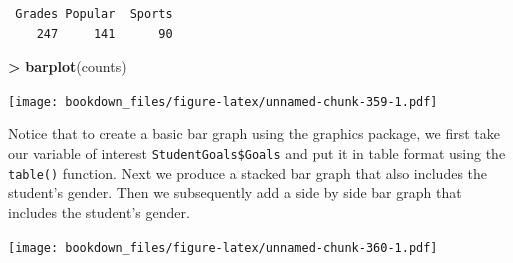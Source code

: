 \documentclass[
]{krantz}
\makeatletter
\newenvironment{Shaded}{\begin{snugshade}}{\end{snugshade}}
\newcommand{\DataTypeTok}[1]{\textcolor[rgb]{0.27,0.27,0.27}{#1}}
\newcommand{\DecValTok}[1]{\textcolor[rgb]{0.06,0.06,0.06}{#1}}
\newcommand{\KeywordTok}[1]{\textcolor[rgb]{0.27,0.27,0.27}{\textbf{#1}}}
\newcommand{\NormalTok}[1]{#1}
\newcommand{\OperatorTok}[1]{\textcolor[rgb]{0.43,0.43,0.43}{\textbf{#1}}}
\newcommand{\StringTok}[1]{\textcolor[rgb]{0.5,0.5,0.5}{#1}}
\newenvironment{kframe}{%
\medskip{}
\setlength{\fboxsep}{.8em}
 \def\at@end@of@kframe{}%
 \ifinner\ifhmode%
  \def\at@end@of@kframe{\end{minipage}}%
  \begin{minipage}{\columnwidth}%
 \fi\fi%
 \def\FrameCommand##1{\hskip\@totalleftmargin \hskip-\fboxsep
 \colorbox{shadecolor}{##1}\hskip-\fboxsep
     \hskip-\linewidth \hskip-\@totalleftmargin \hskip\columnwidth}%
 \MakeFramed {\advance\hsize-\width
   \@totalleftmargin\z@ \linewidth\hsize
   \@setminipage}}%
 {\par\unskip\endMakeFramed%
 \at@end@of@kframe}
\renewenvironment{Shaded}{\begin{kframe}}{\end{kframe}}
\makeatother
\begin{document}
\begin{verbatim}
 Grades Popular  Sports 
    247     141      90 
\end{verbatim}

\begin{Shaded}
\begin{Highlighting}[]
\OperatorTok{\textgreater{}}\StringTok{ }\KeywordTok{barplot}\NormalTok{(counts)}
\end{Highlighting}
\end{Shaded}

\texttt{[image: bookdown\_files/figure-latex/unnamed-chunk-359-1.pdf]}

Notice that to create a basic bar graph using the graphics package, we first take our variable of interest \texttt{StudentGoals\$Goals} and put it in table format using the \texttt{table()} function. Next we produce a stacked bar graph that also includes the student's gender. Then we subsequently add a side by side bar graph that includes the student's gender.

\begin{Shaded}
\end{Shaded}

\texttt{[image: bookdown\_files/figure-latex/unnamed-chunk-360-1.pdf]}
\end{document}
